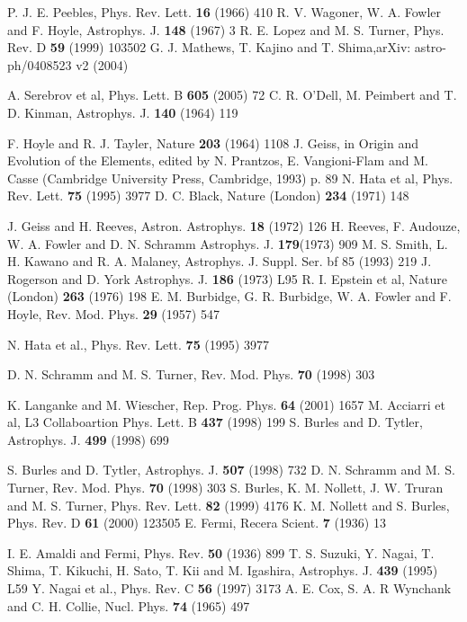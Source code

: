 \begin{thebibliography}{99}
 P. J. E. Peebles, Phys. Rev. Lett. {\bf 16} (1966) 410
 R. V. Wagoner, W. A. Fowler and F. Hoyle, Astrophys. J. {\bf 148} (1967) 3 
 R. E. Lopez and M. S. Turner, Phys. Rev. D {\bf 59} (1999) 103502
 G. J. Mathews, T. Kajino and T. Shima,arXiv: astro-ph/0408523 v2 (2004)

A. Serebrov et al, Phys. Lett. B {\bf 605} (2005) 72
 C. R. O'Dell, M. Peimbert and T. D. Kinman, Astrophys. J. {\bf 140} (1964) 119 

F. Hoyle and R. J. Tayler, Nature {\bf 203} (1964) 1108
 J. Geiss, in Origin and Evolution of the Elements, edited by N. Prantzos, E. Vangioni-Flam and M. Casse (Cambridge University Press, Cambridge, 1993) p. 89
 N. Hata et al, Phys. Rev. Lett. {\bf 75} (1995) 3977
 D. C. Black, Nature (London) {\bf 234} (1971) 148 

J. Geiss and H. Reeves, Astron. Astrophys. {\bf 18} (1972) 126
 H. Reeves, F. Audouze, W. A. Fowler and D. N. Schramm Astrophys. J. {\bf 179}(1973) 909
 M. S. Smith, L. H. Kawano and R. A. Malaney, Astrophys. J. Suppl. Ser. {bf 85} (1993) 219
 J. Rogerson and D. York Astrophys. J. {\bf 186} (1973) L95
 R. I. Epstein et al, Nature (London) {\bf 263} (1976) 198
 E. M. Burbidge, G. R. Burbidge, W. A. Fowler and F. Hoyle, Rev. Mod. Phys. {\bf 29} (1957) 547

N. Hata et al., Phys. Rev. Lett. {\bf 75} (1995) 3977

D. N. Schramm and M. S. Turner, Rev. Mod. Phys. {\bf 70} (1998) 303

K. Langanke and M. Wiescher, Rep. Prog. Phys. {\bf 64} (2001) 1657
 M. Acciarri et al, L3 Collaboartion Phys. Lett. B {\bf 437} (1998) 199
 S. Burles and D. Tytler, Astrophys. J. {\bf 499} (1998) 699

S. Burles and D. Tytler, Astrophys. J. {\bf 507} (1998) 732
 D. N. Schramm and M. S. Turner, Rev. Mod. Phys. {\bf 70} (1998) 303
 S. Burles, K. M. Nollett, J. W. Truran and M. S. Turner, Phys. Rev. Lett. {\bf 82} (1999) 4176
 K. M. Nollett and S. Burles, Phys. Rev. D {\bf 61} (2000) 123505
 E. Fermi, Recera Scient. {\bf 7} (1936) 13

I. E. Amaldi and Fermi, Phys. Rev. {\bf 50} (1936) 899
 T. S. Suzuki, Y. Nagai, T. Shima, T. Kikuchi, H. Sato, T. Kii and M. Igashira, Astrophys. J. {\bf 439} (1995) L59
 Y. Nagai et al., Phys. Rev. C {\bf 56} (1997) 3173
 A. E. Cox, S. A. R Wynchank and C. H. Collie, Nucl. Phys. {\bf 74} (1965) 497


\end{thebibliography}

